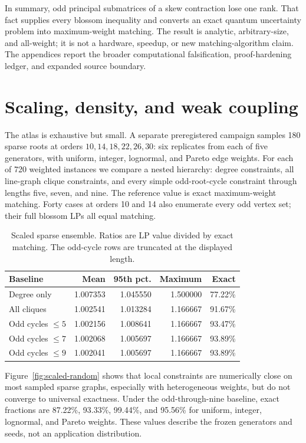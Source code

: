 \documentclass[11pt,a4paper]{article}
\theoremstyle{remark}
\begin{document}
In summary, odd principal submatrices of a skew contraction lose one rank.
That fact supplies every blossom inequality and converts an exact quantum
uncertainty problem into maximum-weight matching. The result is analytic,
arbitrary-size, and all-weight; it is not a hardware, speedup, or new
matching-algorithm claim. The appendices report the broader computational
falsification, proof-hardening ledger, and expanded source boundary.

\appendix

\section{Scaling, density, and weak coupling}

The atlas is exhaustive but small. A separate preregistered campaign samples
180 sparse roots at orders $10,14,18,22,26,30$: six replicates from each of
five generators, with uniform, integer, lognormal, and Pareto edge weights.
For each of 720 weighted instances we compare a nested hierarchy: degree
constraints, all line-graph clique constraints, and every simple odd-root-cycle
constraint through lengths five, seven, and nine. The reference value is exact
maximum-weight matching. Forty cases at orders 10 and 14 also enumerate every
odd vertex set; their full blossom LPs all equal matching.

\begin{table}[H]
\centering
\caption{Scaled sparse ensemble. Ratios are LP value divided by exact matching.
The odd-cycle rows are truncated at the displayed length.}
\label{tab:scaled}
\small
\begin{tabular}{lrrrr}
\toprule
Baseline & Mean & 95th pct. & Maximum & Exact \\
\midrule
Degree only & 1.007353 & 1.045550 & 1.500000 & 77.22\% \\
All cliques & 1.002541 & 1.013284 & 1.166667 & 91.67\% \\
Odd cycles $\leq5$ & 1.002156 & 1.008641 & 1.166667 & 93.47\% \\
Odd cycles $\leq7$ & 1.002068 & 1.005697 & 1.166667 & 93.89\% \\
Odd cycles $\leq9$ & 1.002041 & 1.005697 & 1.166667 & 93.89\% \\
\bottomrule
\end{tabular}
\end{table}

Figure~\ref{fig:scaled-random} shows that local constraints are numerically
close on most sampled sparse graphs, especially with heterogeneous weights,
but do not converge to universal exactness. Under the odd-through-nine
baseline, exact fractions are 87.22\%, 93.33\%, 99.44\%, and 95.56\% for
uniform, integer, lognormal, and Pareto weights. These values describe the
frozen generators and seeds, not an application distribution.
\end{document}
